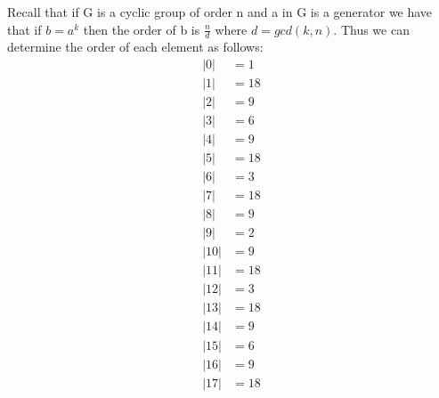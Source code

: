 \documentclass[a4paper, 11pt]{article}
\begin{document}
\noindent Recall that if G is a cyclic group of order n and a in G is a generator we have that if $b=a^k$ then the order of b is $\frac{n}{d}$ where $d = gcd(k,n)$. Thus we can determine the order of each element as follows: 
\begin{align*}
	|0| &= 1 \\ 
	|1| &= 18 \\ 
	|2| &= 9 \\
	|3| &= 6 \\ 
	|4| &= 9 \\ 
	|5| &= 18 \\ 
	|6| &= 3  \\
	|7| &= 18 \\ 
	|8| &= 9 \\ 
	|9| &= 2 \\ 
	|10| &= 9 \\ 
	|11| &= 18 \\ 
	|12| &= 3 \\ 
	|13| &= 18 \\ 
	|14| &= 9 \\ 
	|15| &= 6 \\ 
	|16| &= 9 \\ 
	|17| &= 18 
\end{align*}
\end{document}

